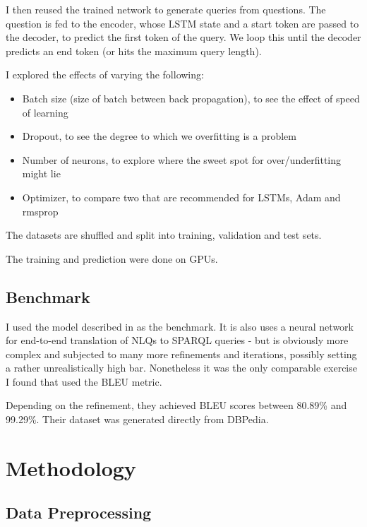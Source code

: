 \documentclass[12pt]{article}
\begin{document}
I then reused the trained network to generate queries from questions. The question
is fed to the encoder, whose LSTM state and a start token are passed to the decoder,
to predict the first token of the query. We loop this until the decoder predicts an
end token (or hits the maximum query length).

I explored the effects of varying the following:

\begin{itemize}
  \item Batch size (size of batch between back propagation), to see the effect of speed of learning
  \item Dropout, to see the degree to which we overfitting is a problem
  \item Number of neurons, to explore where the sweet spot for over/underfitting might lie
  \item Optimizer, to compare two that are recommended for LSTMs, Adam and rmsprop
\end{itemize}

The datasets are shuffled and split into training, validation and test sets.

The training and prediction were done on GPUs.

\subsection{Benchmark}\label{benchmark}

I used the model described in \cite{soru2018neural} as the
benchmark. It is also uses a neural network for end-to-end translation
of NLQs to SPARQL queries - but is obviously more complex and subjected
to many more refinements and iterations, possibly setting a rather
unrealistically high bar. Nonetheless it was the only comparable exercise 
I found that used the BLEU metric.

Depending on the refinement, they achieved BLEU scores between 80.89\%
and 99.29\%. Their dataset was generated directly from DBPedia.

\section{Methodology}\label{iii.-methodology}

\subsection{Data Preprocessing}\label{data-preprocessing}
\end{document}
